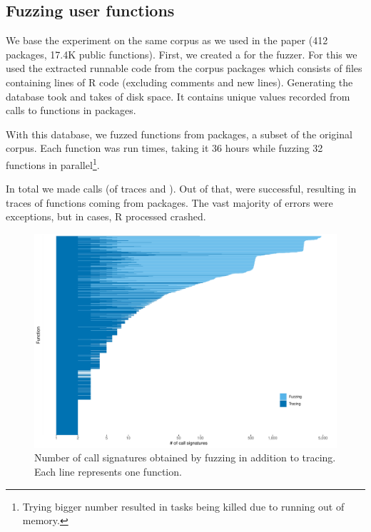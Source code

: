 \documentclass[sigplan,anonymous,review]{acmart}
\begin{document}
\subsection{Fuzzing user functions}

We base the experiment on the same corpus as we used in the \typer paper (412 packages, 17.4K public functions).
First, we created a \sxpdb for the fuzzer.
For this we used the extracted runnable code from the corpus packages which consists of \DBNumSourceFiles files containing \DBSourceLinesOfCodeRnd lines of R code (excluding comments and new lines).
Generating the database took  and takes \DBFileSize of disk space.
It contains \DBValuesRnd unique values recorded from \DBNumCallsRnd calls to \DBNumFunctionsRnd functions in \DBNumPackages packages.

With this database, we fuzzed \UFNumFunctions functions from \UFNumPackages packages, a subset of the original corpus.
Each function was run \UFTracingBudget times, taking it 36 hours while fuzzing 32 functions in parallel\footnote{Trying bigger number resulted in tasks being killed due to running out of memory.}.

In total we made \UFNumTracesRnd calls (\UFTracesSize of traces and \UFTracesReturnDbsSize). Out of that, \UFRatioSuccessTraces were successful, resulting in \UFNumSuccessTraces traces of \UFNumSuccessFunctions functions coming from \UFNumSuccessPackages packages.
The vast majority of errors were exceptions, but in \UFNumOfCrashedRSessions cases, R processed crashed.






\begin{figure}
    \centering
    \includegraphics[width=\columnwidth]{code-and-figures/uf-call-signatures.pdf}
    \caption{
        Number of call signatures obtained by fuzzing in addition to tracing. Each line represents one function.
    }\label{fig:call-signatures}
\end{figure}
\end{document}
